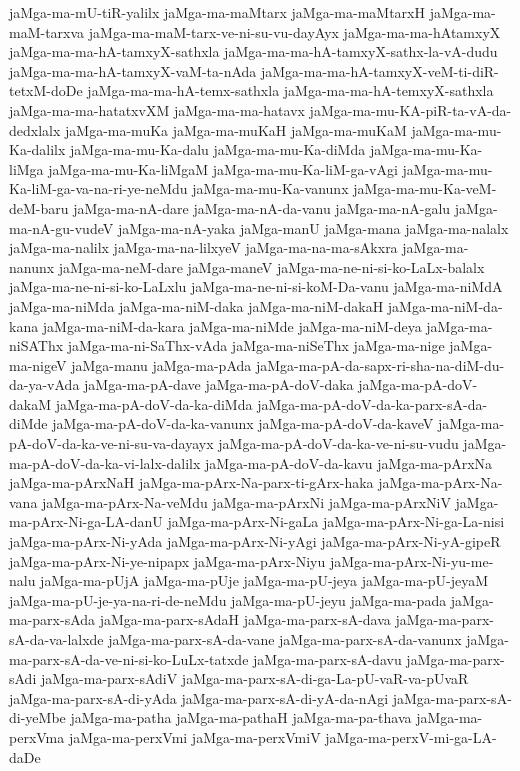 {jaMga-ma-mU-tiR-yalilx
jaMga-ma-maMtarx
jaMga-ma-maMtarxH
jaMga-ma-maM-tarxva
jaMga-ma-maM-tarx-ve-ni-su-vu-dayAyx
jaMga-ma-ma-hAtamxyX
jaMga-ma-ma-hA-tamxyX-sathxla
jaMga-ma-ma-hA-tamxyX-sathx-la-vA-dudu
jaMga-ma-ma-hA-tamxyX-vaM-ta-nAda
jaMga-ma-ma-hA-tamxyX-veM-ti-diR-tetxM-doDe
jaMga-ma-ma-hA-temx-sathxla
jaMga-ma-ma-hA-temxyX-sathxla
jaMga-ma-ma-hatatxvXM
jaMga-ma-ma-hatavx
jaMga-ma-mu-KA-piR-ta-vA-da-dedxlalx
jaMga-ma-muKa
jaMga-ma-muKaH
jaMga-ma-muKaM
jaMga-ma-mu-Ka-dalilx
jaMga-ma-mu-Ka-dalu
jaMga-ma-mu-Ka-diMda
jaMga-ma-mu-Ka-liMga
jaMga-ma-mu-Ka-liMgaM
jaMga-ma-mu-Ka-liM-ga-vAgi
jaMga-ma-mu-Ka-liM-ga-va-na-ri-ye-neMdu
jaMga-ma-mu-Ka-vanunx
jaMga-ma-mu-Ka-veM-deM-baru
jaMga-ma-nA-dare
jaMga-ma-nA-da-vanu
jaMga-ma-nA-galu
jaMga-ma-nA-gu-vudeV
jaMga-ma-nA-yaka
jaMga-manU
jaMga-mana
jaMga-ma-nalalx
jaMga-ma-nalilx
jaMga-ma-na-lilxyeV
jaMga-ma-na-ma-sAkxra
jaMga-ma-nanunx
jaMga-ma-neM-dare
jaMga-maneV
jaMga-ma-ne-ni-si-ko-LaLx-balalx
jaMga-ma-ne-ni-si-ko-LaLxlu
jaMga-ma-ne-ni-si-koM-Da-vanu
jaMga-ma-niMdA
jaMga-ma-niMda
jaMga-ma-niM-daka
jaMga-ma-niM-dakaH
jaMga-ma-niM-da-kana
jaMga-ma-niM-da-kara
jaMga-ma-niMde
jaMga-ma-niM-deya
jaMga-ma-niSAThx
jaMga-ma-ni-SaThx-vAda
jaMga-ma-niSeThx
jaMga-ma-nige
jaMga-ma-nigeV
jaMga-manu
jaMga-ma-pAda
jaMga-ma-pA-da-sapx-ri-sha-na-diM-du-da-ya-vAda
jaMga-ma-pA-dave
jaMga-ma-pA-doV-daka
jaMga-ma-pA-doV-dakaM
jaMga-ma-pA-doV-da-ka-diMda
jaMga-ma-pA-doV-da-ka-parx-sA-da-diMde
jaMga-ma-pA-doV-da-ka-vanunx
jaMga-ma-pA-doV-da-kaveV
jaMga-ma-pA-doV-da-ka-ve-ni-su-va-dayayx
jaMga-ma-pA-doV-da-ka-ve-ni-su-vudu
jaMga-ma-pA-doV-da-ka-vi-lalx-dalilx
jaMga-ma-pA-doV-da-kavu
jaMga-ma-pArxNa
jaMga-ma-pArxNaH
jaMga-ma-pArx-Na-parx-ti-gArx-haka
jaMga-ma-pArx-Na-vana
jaMga-ma-pArx-Na-veMdu
jaMga-ma-pArxNi
jaMga-ma-pArxNiV
jaMga-ma-pArx-Ni-ga-LA-danU
jaMga-ma-pArx-Ni-gaLa
jaMga-ma-pArx-Ni-ga-La-nisi
jaMga-ma-pArx-Ni-yAda
jaMga-ma-pArx-Ni-yAgi
jaMga-ma-pArx-Ni-yA-gipeR
jaMga-ma-pArx-Ni-ye-nipapx
jaMga-ma-pArx-Niyu
jaMga-ma-pArx-Ni-yu-me-nalu
jaMga-ma-pUjA
jaMga-ma-pUje
jaMga-ma-pU-jeya
jaMga-ma-pU-jeyaM
jaMga-ma-pU-je-ya-na-ri-de-neMdu
jaMga-ma-pU-jeyu
jaMga-ma-pada
jaMga-ma-parx-sAda
jaMga-ma-parx-sAdaH
jaMga-ma-parx-sA-dava
jaMga-ma-parx-sA-da-va-lalxde
jaMga-ma-parx-sA-da-vane
jaMga-ma-parx-sA-da-vanunx
jaMga-ma-parx-sA-da-ve-ni-si-ko-LuLx-tatxde
jaMga-ma-parx-sA-davu
jaMga-ma-parx-sAdi
jaMga-ma-parx-sAdiV
jaMga-ma-parx-sA-di-ga-La-pU-vaR-va-pUvaR
jaMga-ma-parx-sA-di-yAda
jaMga-ma-parx-sA-di-yA-da-nAgi
jaMga-ma-parx-sA-di-yeMbe
jaMga-ma-patha
jaMga-ma-pathaH
jaMga-ma-pa-thava
jaMga-ma-perxVma
jaMga-ma-perxVmi
jaMga-ma-perxVmiV
jaMga-ma-perxV-mi-ga-LA-daDe
}
